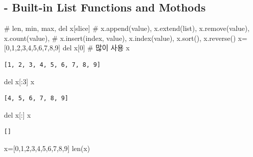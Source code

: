 \documentclass[
  a4paper,
  DIV=11,
  numbers=noendperiod]{scrreprt}
\newenvironment{Shaded}{\begin{snugshade}}{\end{snugshade}}
\newcommand{\BuiltInTok}[1]{\textcolor[rgb]{0.00,0.23,0.31}{#1}}
\newcommand{\CommentTok}[1]{\textcolor[rgb]{0.37,0.37,0.37}{#1}}
\newcommand{\DecValTok}[1]{\textcolor[rgb]{0.68,0.00,0.00}{#1}}
\newcommand{\KeywordTok}[1]{\textcolor[rgb]{0.00,0.23,0.31}{#1}}
\newcommand{\NormalTok}[1]{\textcolor[rgb]{0.00,0.23,0.31}{#1}}
\newcommand{\OperatorTok}[1]{\textcolor[rgb]{0.37,0.37,0.37}{#1}}
\begin{document}
\subsection{- Built-in List Functions and
Mothods}\label{built-in-list-functions-and-mothods}

\begin{Shaded}
\begin{Highlighting}[]
\CommentTok{\# len, min, max, del x[slice]}
\CommentTok{\# x.append(value), x.extend(list), x.remove(value), x.count(value),}
\CommentTok{\# x.insert(index, value), x.index(value), x.sort(), x.reverse()}
\NormalTok{x}\OperatorTok{=}\NormalTok{[}\DecValTok{0}\NormalTok{,}\DecValTok{1}\NormalTok{,}\DecValTok{2}\NormalTok{,}\DecValTok{3}\NormalTok{,}\DecValTok{4}\NormalTok{,}\DecValTok{5}\NormalTok{,}\DecValTok{6}\NormalTok{,}\DecValTok{7}\NormalTok{,}\DecValTok{8}\NormalTok{,}\DecValTok{9}\NormalTok{]}
\KeywordTok{del}\NormalTok{ x[}\DecValTok{0}\NormalTok{] }\CommentTok{\# 많이 사용}
\NormalTok{x}
\end{Highlighting}
\end{Shaded}

\begin{verbatim}
[1, 2, 3, 4, 5, 6, 7, 8, 9]
\end{verbatim}

\begin{Shaded}
\begin{Highlighting}[]
\KeywordTok{del}\NormalTok{ x[:}\DecValTok{3}\NormalTok{]}
\NormalTok{x}
\end{Highlighting}
\end{Shaded}

\begin{verbatim}
[4, 5, 6, 7, 8, 9]
\end{verbatim}

\begin{Shaded}
\begin{Highlighting}[]
\KeywordTok{del}\NormalTok{ x[:]}
\NormalTok{x}
\end{Highlighting}
\end{Shaded}

\begin{verbatim}
[]
\end{verbatim}

\begin{Shaded}
\begin{Highlighting}[]
\NormalTok{x}\OperatorTok{=}\NormalTok{[}\DecValTok{0}\NormalTok{,}\DecValTok{1}\NormalTok{,}\DecValTok{2}\NormalTok{,}\DecValTok{3}\NormalTok{,}\DecValTok{4}\NormalTok{,}\DecValTok{5}\NormalTok{,}\DecValTok{6}\NormalTok{,}\DecValTok{7}\NormalTok{,}\DecValTok{8}\NormalTok{,}\DecValTok{9}\NormalTok{]}
\BuiltInTok{len}\NormalTok{(x)}
\end{Highlighting}
\end{Shaded}
\end{document}
